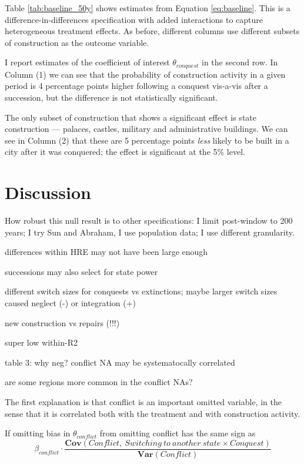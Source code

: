 \documentclass[11pt, a4paper]{article}
\begin{document}
Table \ref{tab:baseline_50y} shows estimates from Equation \eqref{eq:baseline}. This is a difference-in-differences specification with added interactions to capture heterogeneous treatment effects. As before, different columns use different subsets of construction as the outcome variable. 

I report estimates of the coefficient of interest $\theta_{conquest}$ in the second row. In Column (1) we can see that the probability of construction activity in a given period is 4 percentage points higher following a conquest vis-a-vis after a succession, but the difference is not statistically significant.

The only subset of construction that shows a significant effect is state construction --- palaces, castles, military and administrative buildings. We can see in Column (2) that these are 5 percentage points \textit{less} likely to be built in a city after it was conquered; the effect is significant at the 5\% level. 




\section{Discussion} \label{sec:discussion}

How robust this null result is to other specifications: I limit post-window to 200 years; I try Sun and Abraham, I use population data; I use different granularity.

differences within HRE may not have been large enough

successions may also select for state power

different switch sizes for conquests vs extinctions; maybe larger switch sizes caused neglect (-) or integration (+)

new construction vs repairs (!!!)

super low within-R2



table 3: why neg? conflict NA may be systematocally correlated

are some regions more common in the conflict NAs?

The first explanation is that conflict is an important omitted variable, in the sense that it is correlated both with the treatment and with construction activity.

If omitting  bias in $\theta_{conflict}$ from omitting conflict has the same sign as 
$$\beta_{conflict} \cdot \frac{\mathbf{Cov}({Conflict},\: {Switching\: to\: another\: state \times Conquest})}{\mathbf{Var}(Conflict)}$$
\end{document}
